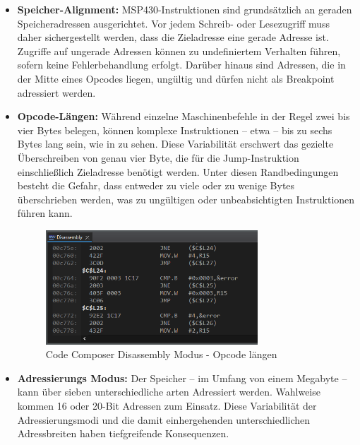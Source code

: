 \begin{itemize}
	\item \textbf{Speicher-Alignment:} MSP430-Instruktionen sind grunds\"atzlich an geraden Speicheradressen ausgerichtet. Vor jedem Schreib- oder Lesezugriff muss daher sichergestellt werden, dass die Zieladresse eine gerade Adresse ist. Zugriffe auf ungerade Adressen k\"onnen zu undefiniertem Verhalten f\"uhren, sofern keine Fehlerbehandlung erfolgt. Dar\"uber hinaus sind Adressen, die in der Mitte eines Opcodes liegen, ung\"ultig und d\"urfen nicht als Breakpoint adressiert werden.
	
	\item \textbf{Opcode-L\"angen:} W\"ahrend einzelne Maschinenbefehle in der Regel zwei bis vier Bytes belegen, k\"onnen komplexe Instruktionen – etwa  – bis zu sechs Bytes lang sein, wie in  zu sehen.  Diese Variabilit\"at erschwert das gezielte \"Uberschreiben von genau vier Byte, die f\"ur die Jump-Instruktion einschlie{\ss}lich Zieladresse ben\"otigt werden. Unter diesen Randbedingungen besteht die Gefahr, dass entweder zu viele oder zu wenige Bytes \"uberschrieben werden, was zu ung\"ultigen oder unbeabsichtigten Instruktionen f\"uhren kann.
	
	\begin{figure}[h!]
		\centering
		\includegraphics[width=0.75\textwidth]{../Bilder/OpcodeLaengen.png}
		\caption{Code Composer Disassembly Modus - Opcode l\"angen}
		\label{fig:DisassemblyOpcodeLaengen}
	\end{figure}
	
	\newpage
	\item \textbf{Adressierungs Modus:} Der Speicher -- im Umfang von einem Megabyte -- kann \"uber sieben unterschiedliche arten Adressiert werden. Wahlweise kommen 16 oder 20-Bit Adressen zum Einsatz. Diese Variabilit\"at der Adressierungsmodi und die damit einhergehenden unterschiedlichen Adressbreiten haben tiefgreifende Konsequenzen. 
\end{itemize}

